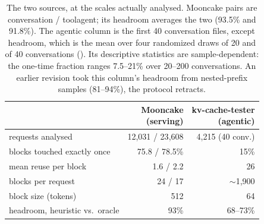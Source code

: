\begin{table}[t]
  \centering \small \setlength{\tabcolsep}{4pt}
  \begin{tabular}{@{}lrr@{}}
    \toprule
     & \makecell{Mooncake\\(serving)} & \makecell{kv-cache-tester\\(agentic)} \\
    \midrule
    requests analysed              & 12{,}031 / 23{,}608 & 4{,}215 (40 conv.) \\
    blocks touched exactly once    & 75.8 / 78.5\% & 15\% \\
    mean reuse per block           & 1.6 / 2.2 & 26 \\
    blocks per request             & 24 / 17 & $\sim$1{,}900 \\
    block size (tokens)            & 512    & 64 \\
    \midrule
    headroom, heuristic vs.\ oracle & 93\%  & 68--73\% \\
    \bottomrule
  \end{tabular}
  \caption{The two sources, at the scales actually analysed. Mooncake pairs are conversation /
  toolagent; its headroom averages the two (93.5\% and 91.8\%). The agentic column is the first 40
  conversation files, except headroom, which is the mean over four randomized draws of 20 and of 40
  conversations (). Its descriptive statistics are sample-dependent: the one-time
  fraction ranges 7.5--21\% over 20--200 conversations. An earlier revision took this column's headroom
  from nested-prefix samples (81--94\%), the protocol  retracts.}
  \label{tab:regimes}
\end{table}
